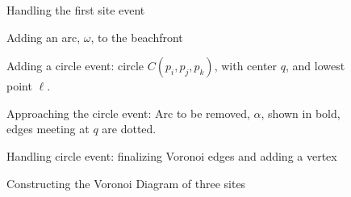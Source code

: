 \documentclass[12pt,twoside]{reedthesis}
\begin{document}
      \begin{figure}[!htb]
        \centering
        \begin{subtable}{0.475\textwidth}
          \centering
          
          \caption{Handling the first site event}
          \label{fig:fortune_0}
        \end{subtable}%
        \begin{subtable}{0.475\textwidth}
          \centering
          
          \caption{Adding an arc, $\omega$, to the beachfront}
          \label{fig:fortune_1}
        \end{subtable}
      \end{figure}
      \begin{figure}[!htb]
      \ContinuedFloat
        \begin{subtable}{0.475\textwidth}
          \centering
          
          \caption{Adding a circle event: circle $C(p_{i}, p_{j}, p_{k})$, with center $q$, and lowest point $\ell$.}
          \label{fig:fortune_2}
        \end{subtable}
        \begin{subtable}{0.475\textwidth}
          \centering
          
          \caption{Approaching the circle event: Arc to be removed, $\alpha$, shown in bold, edges meeting at $q$ are dotted.}
          \label{fig:fortune_3}
        \end{subtable}
      \end{figure}

      \begin{figure}[!htb]
      \ContinuedFloat
      \centering
        \begin{subtable}{0.475\textwidth}
          \centering
          
          \caption{Handling circle event: finalizing Voronoi edges and adding a vertex}
          \label{fig:fortune_done}
        \end{subtable}
        \caption{Constructing the Voronoi Diagram of three sites}
        \label{fig:construct_vorof_3}
      \end{figure}

\end{document}
